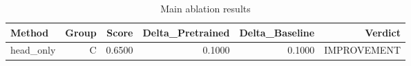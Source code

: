 \begin{table}[htbp]
\centering
\caption{Main ablation results}
\label{tab:main-results}
\begin{tabular}{lrrrrr}
\toprule
\textbf{Method} & \textbf{Group} & \textbf{Score} & \textbf{Delta\_Pretrained} & \textbf{Delta\_Baseline} & \textbf{Verdict} \\
\midrule
head\_only & C & 0.6500 & 0.1000 & 0.1000 & IMPROVEMENT \\
\bottomrule
\end{tabular}
\end{table}